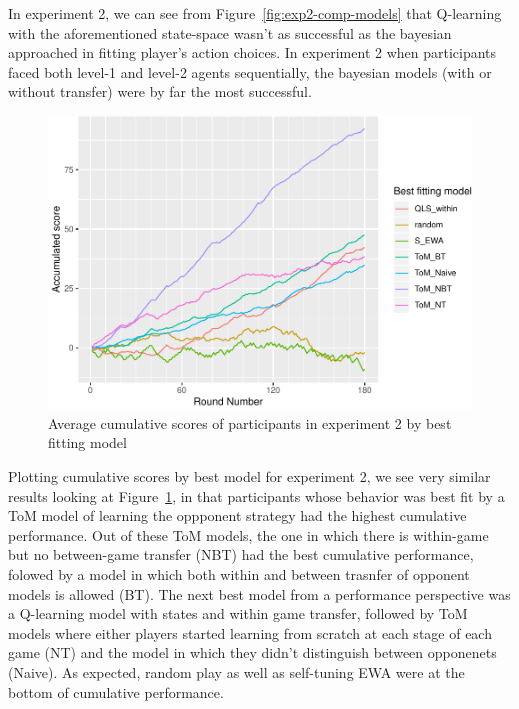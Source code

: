 \documentclass[man,floatsintext]{apa6}
\begin{document}
In experiment 2, we can see from Figure~\ref{fig:exp2-comp-models} that Q-learning with the aforementioned state-space wasn't as successful as the bayesian approached in fitting player's action choices. In experiment 2 when participants faced both level-1 and level-2 agents sequentially, the bayesian models (with or without transfer) were by far the most successful.

\begin{figure}

{\centering \includegraphics{draft_report_v1_files/figure-latex/exp2-cumScores-1} 

}

\caption{Average cumulative scores of participants in experiment 2 by best fitting model}\label{fig:exp2-cumScores}
\end{figure}

Plotting cumulative scores by best model for experiment 2, we see very similar results looking at Figure~\ref{fig:exp2-cumScores}, in that participants whose behavior was best fit by a ToM model of learning the oppponent strategy had the highest cumulative performance. Out of these ToM models, the one in which there is within-game but no between-game transfer (NBT) had the best cumulative performance, folowed by a model in which both within and between trasnfer of opponent models is allowed (BT). The next best model from a performance perspective was a Q-learning model with states and within game transfer, followed by ToM models where either players started learning from scratch at each stage of each game (NT) and the model in which they didn't distinguish between opponenets (Naive). As expected, random play as well as self-tuning EWA were at the bottom of cumulative performance.
\end{document}

